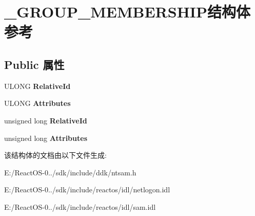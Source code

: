\hypertarget{struct___g_r_o_u_p___m_e_m_b_e_r_s_h_i_p}{}\section{\+\_\+\+G\+R\+O\+U\+P\+\_\+\+M\+E\+M\+B\+E\+R\+S\+H\+I\+P结构体 参考}
\label{struct___g_r_o_u_p___m_e_m_b_e_r_s_h_i_p}
\subsection*{Public 属性}
\begin{DoxyCompactItemize}
\item 
\mbox{\label{struct___g_r_o_u_p___m_e_m_b_e_r_s_h_i_p_a536e1563012d6bf9721d4d95945037ca}} 
U\+L\+O\+NG {\bfseries Relative\+Id}
\item 
\mbox{\label{struct___g_r_o_u_p___m_e_m_b_e_r_s_h_i_p_a91f61c71a51c6078518f90e1ab33d1b8}} 
U\+L\+O\+NG {\bfseries Attributes}
\item 
\mbox{\label{struct___g_r_o_u_p___m_e_m_b_e_r_s_h_i_p_af4813350843787beb5c99f8a6fb3600b}} 
unsigned long {\bfseries Relative\+Id}
\item 
\mbox{\label{struct___g_r_o_u_p___m_e_m_b_e_r_s_h_i_p_afcf584e3c68aab682a471d1ba0041b51}} 
unsigned long {\bfseries Attributes}
\end{DoxyCompactItemize}


该结构体的文档由以下文件生成\+:\begin{DoxyCompactItemize}
\item 
E\+:/\+React\+O\+S-\/0../sdk/include/ddk/ntsam.\+h\item 
E\+:/\+React\+O\+S-\/0../sdk/include/reactos/idl/netlogon.\+idl\item 
E\+:/\+React\+O\+S-\/0../sdk/include/reactos/idl/sam.\+idl\end{DoxyCompactItemize}
